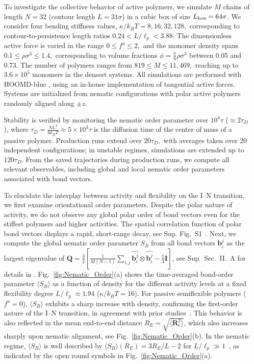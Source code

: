 \documentclass[
reprint,
superscriptaddress,
prl,









 amsmath,amssymb,
 aps,






]{revtex4-2}
\begin{document}
To investigate the collective behavior of active polymers, we simulate $M$ chains of length $N=32$ (contour length $L=31\sigma$) in a cubic box of size $L_{\rm box} = 64\sigma$. We consider four bending stiffness values, $\kappa/k_BT = 8,16,32,128,$ corresponding to  contour-to-persistence length ratios $0.24 < L/\ell_p < 3.88.$ The dimensionless active force is varied in the range $0 \le f^a \le 2,$ and the monomer density spans $0.1 \le \rho \sigma^3 \le 1.4,$ corresponding to volume fractions $\phi = \frac{\pi}{6} \rho \sigma^3$ between 0.05 and 0.73. The number of polymers ranges from $819 \le M \le 11{,}469,$ reaching up to $3.6 \times 10^5$ monomers in the densest systems. All simulations are performed with HOOMD-blue \cite{Anderson2020}, using an in-house implementation of tangential active forces. Systems are initialized from nematic configurations with polar active polymers randomly aligned along $\pm z$.

Stability is verified by monitoring the nematic order parameter over $10^4\tau$ ($\approx 2\tau_D$), where $\tau_D = \frac{NL^2}{6k_BT} \approx 5\times 10^3 \tau$ is the diffusion time of the center of mass of a passive polymer. Production runs extend over $20\tau_D,$ with averages taken over 20 independent configurations; in unstable regimes, simulations are extended up to $120\tau_D.$ From the saved trajectories during production runs, we compute all relevant observables, including global and local nematic order parameters associated with bond vectors.

To elucidate the interplay between activity  and flexibility on the I--N transition, we first examine orientational order parameters. Despite the polar nature of activity, we do not observe any global polar order of bond vectors even for the stiffest polymers and higher activities. The spatial correlation function of polar bond vectors displays a rapid, short-range decay, see Sup. Fig.~S1~\cite{SM}.
Next, we compute the global nematic order parameter $S_B$ from all bond vectors  $\boldsymbol{b}_i^j$ as the largest eigenvalue of $\mathbf{Q}=\frac{3}{2} [\frac{1}{M (N-1)}\sum_{i,j} \hat{\boldsymbol{b}_i^j}\otimes \hat{\boldsymbol{b}_i^j}  - \frac{1}{3} \mathbf{I}] $, see Sup.~Sec.~II.~A for details in \cite{SM}. Fig.~\ref{fig:Nematic_Order}(a) shows the time-averaged bond-order parameter $\langle S_B \rangle$ as a function of density for the different activity levels at a fixed flexibility degree $L/\ell_p \approx 1.94$ ($\kappa/k_BT = 16$). For passive semiflexible polymers ($f^a = 0$), $\langle S_B \rangle$ exhibits a sharp increase with density, confirming the first-order nature of the I--N transition, in agreement with prior studies~\cite{Binder_PRL_2016,Egorov2016}. This behavior is also reflected in the mean end-to-end distance $R_E = \sqrt{\langle \boldsymbol{R}_e^2 \rangle}$, which also increases sharply upon nematic alignment, see Fig.~\ref{fig:Nematic_Order}(b).
In the nematic regime, $\langle S_B \rangle$ is well described by $\langle S_B \rangle(R_E) = 3R_E/L - 2$ for $L/\ell_p \gg 1$~\cite{Egorov2016}, as indicated by the  open round symbols in Fig.~\ref{fig:Nematic_Order}(a).
\end{document}
